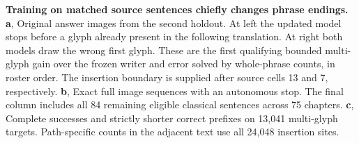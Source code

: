 \textbf{Training on matched source sentences chiefly changes phrase endings.}
\textbf{a}, Original answer images from the second holdout. At left the updated model stops before a glyph already present in the following translation. At right both models draw the wrong first glyph. These are the first qualifying bounded multi-glyph gain over the frozen writer and error solved by whole-phrase counts, in roster order. The insertion boundary is supplied after source cells 13 and 7, respectively.
\textbf{b}, Exact full image sequences with an autonomous stop. The final column includes all 84 remaining eligible classical sentences across 75 chapters. \textbf{c}, Complete successes and strictly shorter correct prefixes on 13,041 multi-glyph targets. Path-specific counts in the adjacent text use all 24,048 insertion sites.
